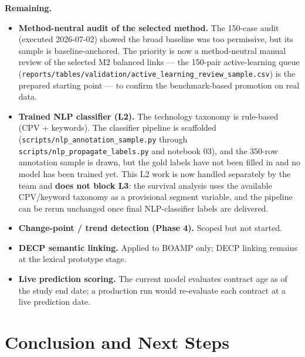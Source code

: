 \documentclass[11pt,a4paper]{article}
\begin{document}
\textbf{Remaining.}
\begin{itemize}[leftmargin=1.4em,itemsep=2pt]
  \item \textbf{Method-neutral audit of the selected method.} The 150-case
        audit (executed 2026-07-02) showed the broad baseline was too
        permissive, but its sample is baseline-anchored. The priority is now a
        method-neutral manual review of the selected M2 balanced links --- the
        150-pair active-learning queue
        (\nolinkurl{reports/tables/validation/active_learning_review_sample.csv})
        is the prepared starting point --- to confirm the benchmark-based
        promotion on real data.
  \item \textbf{Trained NLP classifier (L2).} The technology taxonomy is
        rule-based (CPV + keywords). The classifier pipeline is scaffolded
        (\nolinkurl{scripts/nlp_annotation_sample.py} through
        \nolinkurl{scripts/nlp_propagate_labels.py} and notebook 03), and the
        350-row annotation sample is drawn, but the gold labels have not been
        filled in and no model has been trained yet. This L2 work is now
        handled separately by the team and \textbf{does not block L3}: the
        survival analysis uses the available CPV/keyword taxonomy as a
        provisional segment variable, and the pipeline can be rerun unchanged
        once final NLP-classifier labels are delivered.
  \item \textbf{Change-point / trend detection (Phase 4).} Scoped but not started.
  \item \textbf{DECP semantic linking.} Applied to BOAMP only; DECP linking remains
        at the lexical prototype stage.
  \item \textbf{Live prediction scoring.} The current model evaluates contract age
        as of the study end date; a production run would re-evaluate each contract
        at a live prediction date.
\end{itemize}

\section{Conclusion and Next Steps}
\end{document}
